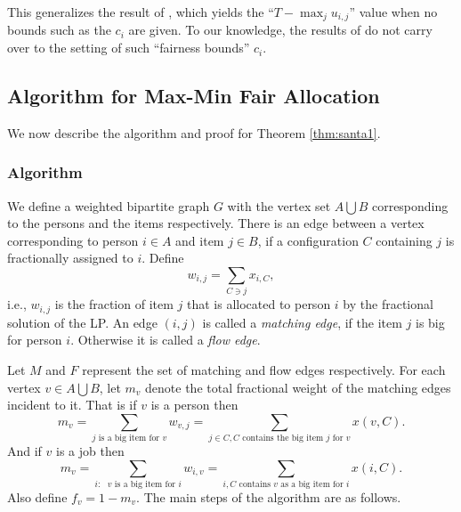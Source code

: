 This generalizes the result of \cite{dani:05}, which yields the
``$T - \max_{j} u_{i,j}$'' value when no bounds such as the $c_i$ are given.
To our knowledge, the results of
\cite{julia:focs09,asadpour:stoc07,asadpour-feige-saberi,bansal:stoc06}
do not carry over to the setting of such ``fairness bounds'' $c_i$.

\subsection{Algorithm for Max-Min Fair Allocation}
\label{subsec:algo}

We now describe the algorithm and proof for Theorem \ref{thm:santa1}.

\subsubsection{Algorithm}

We define a weighted bipartite graph $G$ with the vertex set $A \bigcup B$ corresponding to the persons and the items respectively. There is an edge between a vertex corresponding to person $i \in A$ and item $j \in B$, if a configuration $C$ containing $j$ is fractionally assigned to $i$. Define
$$w_{i,j}=\sum_{C \ni j} x_{i,C},$$
i.e., $w_{i,j}$ is the
fraction of item $j$ that is allocated to person $i$ by the fractional solution of the LP. An edge $(i,j)$ is called a {\em matching edge}, if the item $j$ is big for person $i$. Otherwise it is called a {\em flow edge}.





Let $M$ and $F$ represent the set of matching and flow edges respectively. For each vertex $v \in A \bigcup B$, let $m_{v}$ denote the total fractional weight of the matching edges incident to it. That is if $v$ is a person then $$m_v=\sum_{j \text{ is a big item for } v} w_{v,j}=\sum_{j \in C, C \text{ contains the big item $j$ for } v} x(v,C).$$ And if $v$ is a job then $$m_v=\sum_{i: \text{ $v$ is a big item for } i} w_{i,v}=\sum_{i,  C \text{ contains $v$ as a big item for } i} x(i,C).$$  Also define $f_{v}=1-m_v$. The main steps of the algorithm are as follows.

\bigskip


